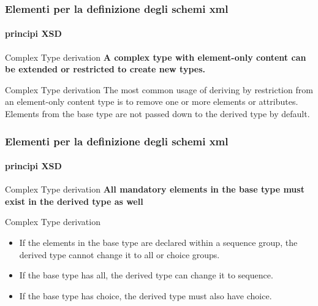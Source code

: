 

\begin{frame}
	\frametitle{Elementi per la definizione degli schemi xml}
	\framesubtitle{principi XSD}
	\addtocounter{nframe}{1}

	\begin{block}{Complex Type derivation}
		\textbf{A complex type with element-only content can be extended or restricted to create new types.}
	\end{block}

	\begin{block}{Complex Type derivation}
		The most common usage of deriving by restriction from an element-only content type is to remove one or more elements or attributes. Elements from the base type are not passed down to the derived type by default.
	\end{block}
\end{frame}


\begin{frame}
	\frametitle{Elementi per la definizione degli schemi xml}
	\framesubtitle{principi XSD}
	\addtocounter{nframe}{1}

	\begin{block}{Complex Type derivation}
		\textbf{All mandatory elements in the base type must exist in the derived type as well}
	\end{block}

	\begin{block}{Complex Type derivation}
		\begin{itemize}
			\item If the elements in the base type are declared within a sequence group, the derived type cannot change it to all or choice groups. 
			\item If the base type has all, the derived type can change it to sequence. 
			\item If the base type has choice, the derived type must also have choice.
		\end{itemize}
	\end{block}
\end{frame}

